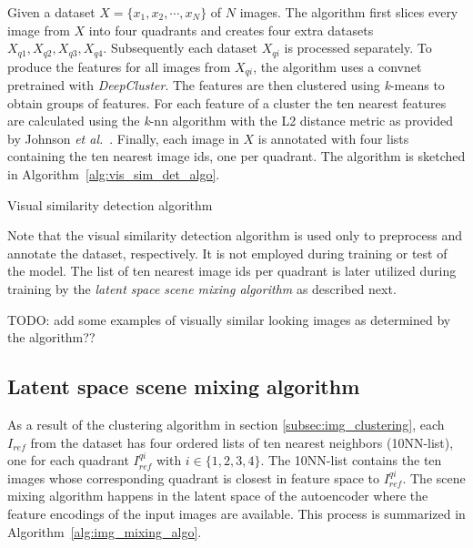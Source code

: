\documentclass[12pt,a4paper]{article}
\begin{document}
Given a dataset $X = \{x_1,x_2,\cdots,x_N\}$ of $N$ images. The algorithm first slices every image from $X$ into four quadrants and creates four extra datasets $X_{q1}, X_{q2}, X_{q3}, X_{q4}$. Subsequently each dataset $X_{qi}$ is processed separately. To produce the features for all images from $X_{qi}$, the algorithm uses a convnet pretrained with \textit{DeepCluster}. The features are then clustered using \textit{k}-means to obtain groups of features. For each feature of a cluster the ten nearest features are calculated using the \textit{k}-nn algorithm with the L2 distance metric as provided by Johnson \textit{et al.}~\cite{FaissKnn}. Finally, each image in $X$ is annotated with four lists containing the ten nearest image ids, one per quadrant. The algorithm is sketched in Algorithm~\ref{alg:vis_sim_det_algo}.

\begin{algorithm}[H]
\DontPrintSemicolon
\LinesNumbered
{}
\caption{Visual similarity detection algorithm}\label{alg:vis_sim_det_algo}
\end{algorithm}

Note that the visual similarity detection algorithm is used only to preprocess and annotate the dataset, respectively. It is not employed during training or test of the model. The list of ten nearest image ids per quadrant is later utilized during training by the \textit{latent space scene mixing algorithm} as described next.

TODO: add some examples of visually similar looking images as determined by the algorithm??


\subsection{Latent space scene mixing algorithm} \label{subsec:img_mixing_algo}
As a result of the clustering algorithm in section \ref{subsec:img_clustering}, each $I_{ref}$ from the dataset has four ordered lists of ten nearest neighbors (10NN-list), one for each quadrant $I^{qi}_{ref}$ with $i \in \{1,2,3,4\}$. The 10NN-list contains the ten images whose corresponding quadrant is closest in feature space to $I^{qi}_{ref}$. The scene mixing algorithm happens in the latent space of the autoencoder where the feature encodings of the input images are available. This process is summarized in Algorithm~\ref{alg:img_mixing_algo}. 
\end{document}
